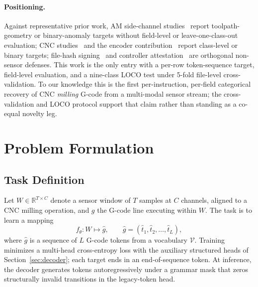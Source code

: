 \documentclass[sensors,article,submit,moreauthors,pdftex]{Definitions/mdpi}
\begin{document}
\paragraph{Positioning.} Against representative prior work, AM side-channel studies~\cite{alfaruque2016acoustic,song2016my,chhetri2016kcad,chattopadhyay2025video} report toolpath-geometry or binary-anomaly targets without field-level or leave-one-class-out evaluation; CNC studies~\cite{stathatos2024cnn,coelho2024anomaly,kimmell2025cnc} and the encoder contribution~\cite{encoder_paper} report class-level or binary targets; file-hash signing~\cite{belikovetsky2017drowned,nist2024fmnet} and controller attestation~\cite{zonouz2014plc} are orthogonal non-sensor defenses. This work is the only entry with a per-row token-sequence target, field-level evaluation, and a nine-class LOCO test under 5-fold file-level cross-validation.\label{sec:related-comparison} To our knowledge this is the first per-instruction, per-field categorical recovery of CNC \emph{milling} G-code from a multi-modal sensor stream; the cross-validation and LOCO protocol support that claim rather than standing as a co-equal novelty leg.


\section{Problem Formulation}
\label{sec:problem}

\subsection{Task Definition}
\label{sec:task}

Let $W \in \mathbb{R}^{T \times C}$ denote a sensor window of $T$ samples at $C$ channels, aligned to a CNC milling operation, and $g$ the G-code line executing within $W$. The task is to learn a mapping
\begin{equation*}
  f_\theta: W \mapsto \hat{g}, \qquad \hat{g} = (\hat{t}_1, \hat{t}_2, \dots, \hat{t}_L),
\end{equation*}
where $\hat{g}$ is a sequence of $L$ G-code tokens from a vocabulary $\mathcal{V}$. Training minimizes a multi-head cross-entropy loss with the auxiliary structured heads of Section~\ref{sec:decoder}; each target ends in an end-of-sequence token. At inference, the decoder generates tokens autoregressively under a grammar mask that zeros structurally invalid transitions in the legacy-token head.
\end{document}
